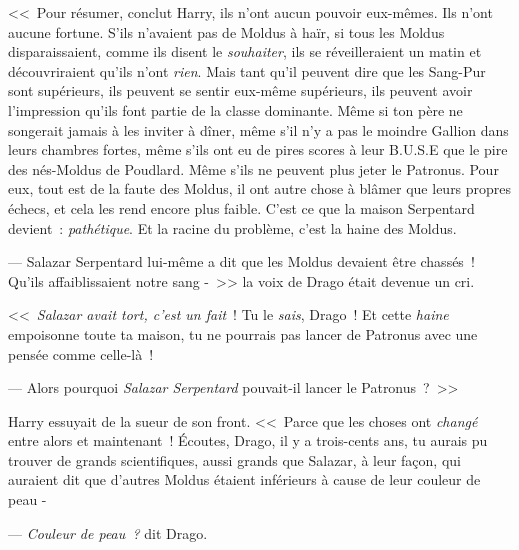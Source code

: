 <<~Pour résumer, conclut Harry, ils n'ont aucun pouvoir eux-mêmes. Ils n'ont aucune fortune. S'ils n'avaient pas de Moldus à haïr, si tous les Moldus disparaissaient, comme ils disent le \emph{souhaiter}, ils se réveilleraient un matin et découvriraient qu'ils n'ont \emph{rien}. Mais tant qu'il peuvent dire que les Sang-Pur sont supérieurs, ils peuvent se sentir eux-même supérieurs, ils peuvent avoir l'impression qu'ils font partie de la classe dominante. Même si ton père ne songerait jamais à les inviter à dîner, même s'il n'y a pas le moindre Gallion dans leurs chambres fortes, même s'ils ont eu de pires scores à leur B.U.S.E que le pire des nés-Moldus de Poudlard. Même s'ils ne peuvent plus jeter le Patronus. Pour eux, tout est de la faute des Moldus, il ont autre chose à blâmer que leurs propres échecs, et cela les rend encore plus faible. C'est ce que la maison Serpentard devient~: \emph{pathétique}. Et la racine du problème, c'est la haine des Moldus.

--- Salazar Serpentard lui-même a dit que les Moldus devaient être chassés~! Qu'ils affaiblissaient notre sang -~>> la voix de Drago était devenue un cri.

<<~\emph{Salazar avait tort, c'est un fait}~! Tu le \emph{sais}, Drago~! Et cette \emph{haine} empoisonne toute ta maison, tu ne pourrais pas lancer de Patronus avec une pensée comme celle-là~!

--- Alors pourquoi \emph{Salazar Serpentard} pouvait-il lancer le Patronus~?~>>

Harry essuyait de la sueur de son front.
<<~Parce que les choses ont \emph{changé} entre alors et maintenant~! Écoutes, Drago, il y a trois-cents ans, tu aurais pu trouver de grands scientifiques, aussi grands que Salazar, à leur façon, qui auraient dit que d'autres Moldus étaient inférieurs à cause de leur couleur de peau -

--- \emph{Couleur de peau~?} dit Drago.

